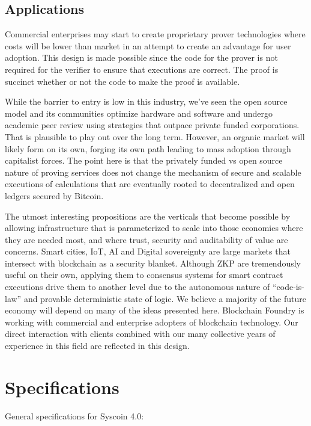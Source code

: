 \documentclass[peerreview]{ieeesyscoin}
\begin{document}
\subsection{Applications}

Commercial enterprises may start to create proprietary prover technologies where costs will be lower than market in an attempt to create an advantage for user adoption. This design is made possible since the code for the prover is not required for the verifier to ensure that executions are correct. The proof is succinct whether or not the code to make the proof is available.

While  the barrier to entry is low in this industry, we’ve seen the open source model and its communities optimize hardware and software and undergo academic peer review using strategies  that outpace private funded corporations. That is plausible to play out over the long term. However, an organic market will likely form on its own, forging its own path leading to mass adoption through capitalist forces. The point here is that the privately funded vs open source nature of proving services does not change the mechanism of secure and scalable executions of calculations that are eventually rooted to decentralized and open ledgers secured by Bitcoin.

The utmost interesting propositions are the verticals that become possible by allowing infrastructure that is parameterized to scale into those economies where they are needed most, and where trust, security and auditability of value are concerns. Smart cities, IoT, AI and Digital sovereignty are large markets that intersect with blockchain as a security blanket. Although ZKP are tremendously useful on their own, applying them to consensus systems for smart contract executions drive them to another level due to the autonomous nature of “code-is-law” and provable deterministic state of logic. We believe a majority of the future economy will depend on many of the ideas presented here. Blockchain Foundry is working with commercial and enterprise adopters of blockchain technology. Our direct interaction with clients combined with our many collective years of experience in this field are reflected in this design.


\section{Specifications}
\label{section:specs}

General specifications for Syscoin 4.0:
\end{document}
